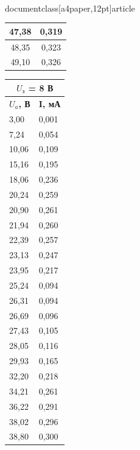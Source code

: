 \\documentclass[a4paper,12pt]{article}
\begin{document}
\begin{table}[h]
\begin{minipage}{0.3\textwidth}
\begin{tabular}{|cc|}
\multicolumn{1}{|c|}{47,38} & 0,319 \\ \hline
\multicolumn{1}{|c|}{48,35} & 0,323 \\ \hline
\multicolumn{1}{|c|}{49,10} & 0,326 \\ \hline
\end{tabular}
\end{minipage}
\begin{minipage}{0.3\textwidth}
\begin{tabular}{|ll|}
\hline
\multicolumn{2}{|c|}{\textbf{$U_з$ = 8 В}} \\ \hline
\multicolumn{1}{|c|}{\textbf{$U_a$, В}} & \multicolumn{1}{c|}{\textbf{I, мА}} \\ \hline
\multicolumn{1}{|l|}{3,00} & 0,001 \\ \hline
\multicolumn{1}{|l|}{7,24} & 0,054 \\ \hline
\multicolumn{1}{|l|}{10,06} & 0,109 \\ \hline
\multicolumn{1}{|l|}{15,16} & 0,195 \\ \hline
\multicolumn{1}{|l|}{18,06} & 0,236 \\ \hline
\multicolumn{1}{|l|}{20,24} & 0,259 \\ \hline
\multicolumn{1}{|l|}{20,90} & 0,261 \\ \hline
\multicolumn{1}{|l|}{21,94} & 0,260 \\ \hline
\multicolumn{1}{|l|}{22,39} & 0,257 \\ \hline
\multicolumn{1}{|l|}{23,13} & 0,247 \\ \hline
\multicolumn{1}{|l|}{23,95} & 0,217 \\ \hline
\multicolumn{1}{|l|}{25,24} & 0,094 \\ \hline
\multicolumn{1}{|l|}{26,31} & 0,094 \\ \hline
\multicolumn{1}{|l|}{26,69} & 0,096 \\ \hline
\multicolumn{1}{|l|}{27,43} & 0,105 \\ \hline
\multicolumn{1}{|l|}{28,05} & 0,116 \\ \hline
\multicolumn{1}{|l|}{29,93} & 0,165 \\ \hline
\multicolumn{1}{|l|}{32,20} & 0,218 \\ \hline
\multicolumn{1}{|l|}{34,21} & 0,261 \\ \hline
\multicolumn{1}{|l|}{36,22} & 0,291 \\ \hline
\multicolumn{1}{|l|}{38,02} & 0,296 \\ \hline
\multicolumn{1}{|l|}{38,80} & 0,300 \\ \hline

\end{tabular}
\end{minipage}
\end{table}
\end{document}
